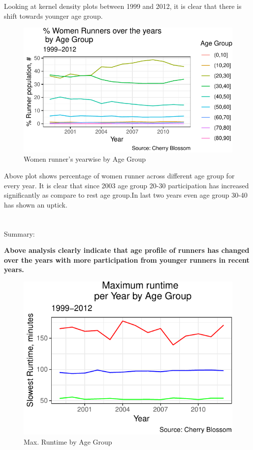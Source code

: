 \documentclass[
]{article}
\begin{document}
Looking at kernel density plots between 1999 and 2012, it is clear that
there is shift towards younger age group.

\begin{figure}[H]

{\centering \includegraphics{case_study02_files/figure-latex/unnamed-chunk-18-1} 

}

\caption{Women runner's yearwise by Age Group}\label{fig:unnamed-chunk-18}
\end{figure}

Above plot shows percentage of women runner across different age group
for every year. It is clear that since 2003 age group 20-30
participation has increased significantly as compare to rest age
group.In last two years even age group 30-40 has shown an uptick.\\
~\\
~\\
Summary:

\textbf{Above analysis clearly indicate that age profile of runners has
changed over the years with more participation from younger runners in
recent years.}

\begin{figure}[H]

{\centering \includegraphics{case_study02_files/figure-latex/unnamed-chunk-19-1} 

}

\caption{Max. Runtime by Age Group}\label{fig:unnamed-chunk-19}
\end{figure}
\end{document}
